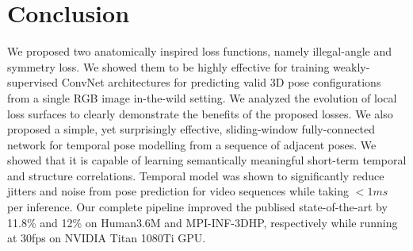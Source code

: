 \documentclass[runningheads]{llncs}
\begin{document}
\vspace{-02em}
\section{Conclusion}
\vspace{-1em}
We proposed two anatomically inspired loss functions, namely illegal-angle and symmetry loss. We showed them to be highly effective for training weakly-supervised ConvNet architectures for predicting valid 3D pose configurations from a single RGB image in-the-wild setting. We analyzed the evolution of local loss surfaces to clearly demonstrate the benefits of the proposed losses. We also proposed a simple, yet surprisingly effective, sliding-window fully-connected network for temporal pose modelling from a sequence of adjacent poses. We showed that it is capable of learning semantically meaningful short-term temporal and structure correlations. Temporal model was shown to significantly reduce jitters and noise from pose prediction for video sequences while taking $< 1ms$ per inference. Our complete pipeline improved the publised state-of-the-art by 11.8\% and 12\% on Human3.6M and MPI-INF-3DHP, respectively while running at 30fps on NVIDIA Titan 1080Ti GPU.
\vspace{2.5em}

{
\small


}
\end{document}
